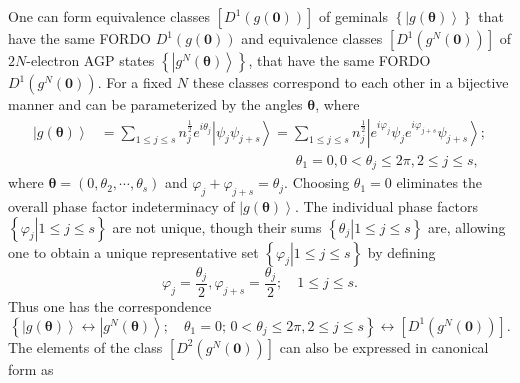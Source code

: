 \documentclass[aps,preprint]{revtex4}%
\begin{document}
One can form equivalence classes $\left[  D^{1}\left(  g\left(  \mathbf{0}%
\right)  \right)  \right]  $ of geminals $\left\{  \left\vert g\left(
\mathbf{\theta}\right)  \right\rangle \right\}  $ that have the same FORDO
$D^{1}\left(  g\left(  \mathbf{0}\right)  \right)  $ and equivalence classes
$\left[  D^{1}\left(  g^{N}\left(  \mathbf{0}\right)  \right)  \right]  $ of
$2N$-electron AGP states $\left\{  \left\vert g^{N}\left(  \mathbf{\theta
}\right)  \right\rangle \right\}  $, that have the same FORDO $D^{1}\left(
g^{N}\left(  \mathbf{0}\right)  \right)  $. For a fixed $N$ these classes
correspond to each other in a bijective manner \cite{coleman} and can be
parameterized by the angles $\mathbf{\theta}$, where
\begin{align}
\left\vert g\left(  \mathbf{\theta}\right)  \right\rangle  &  =\sum_{1\leq
j\leq s}n_{j}^{\frac{1}{2}}e^{i\theta_{j}}\left\vert \psi_{j}\psi
_{j+s}\right\rangle =\sum_{1\leq j\leq s}n_{j}^{\frac{1}{2}}\left\vert
e^{i\varphi_{j}}\psi_{j}e^{i\varphi_{j+s}}\psi_{j+s}\right\rangle ;\nonumber\\
&  \qquad\qquad\qquad\qquad\qquad\qquad\qquad\theta_{1}=0,0<\theta_{j}\leq
2\pi,2\leq j\leq s,
\end{align}
where $\mathbf{\theta=}\left(  0,\theta_{2},\cdots,\theta_{s}\right)  $ and
$\varphi_{j}+\varphi_{j+s}=\theta_{j}$. Choosing $\theta_{1}=0$ eliminates the
overall phase factor indeterminacy of $\left\vert g\left(  \mathbf{\theta
}\right)  \right\rangle $. The individual phase factors $\left\{  \left.
\varphi_{j}\right\vert 1\leq j\leq s\right\}  $ are not unique, though their
sums $\left\{  \left.  \theta_{j}\right\vert 1\leq j\leq s\right\}  $ are,
allowing one to obtain a unique representative set $\left\{  \left.
\varphi_{j}\right\vert 1\leq j\leq s\right\}  $ by defining
\begin{equation}
\varphi_{j}=\frac{\theta_{j}}{2},\varphi_{j+s}=\frac{\theta_{j}}{2};\quad1\leq
j\leq s.
\end{equation}
Thus one has the correspondence
\begin{equation}
\left\{  \left\vert g\left(  \mathbf{\theta}\right)  \right\rangle
\longleftrightarrow\left\vert g^{N}\left(  \mathbf{\theta}\right)
\right\rangle ;\quad\theta_{1}=0;\,0<\theta_{j}\leq2\pi,2\leq j\leq s\right\}
\longleftrightarrow\left[  D^{1}\left(  g^{N}\left(  \mathbf{0}\right)
\right)  \right]  .
\end{equation}
The elements of the class $\left[  D^{2}\left(  g^{N}\left(  \mathbf{0}%
\right)  \right)  \right]  $ can also be expressed in canonical form as
\end{document}
